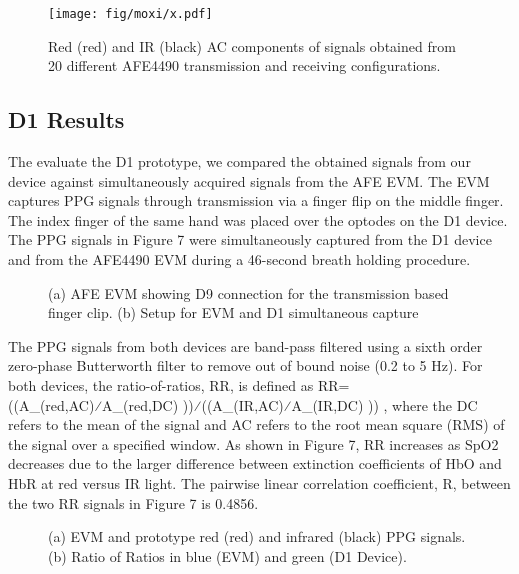         \begin{figure}
            \begin{center}
            \texttt{[image: fig/moxi/x.pdf]}
            \end{center}
            \caption{Red (red) and IR (black) AC components of signals obtained from 20 different AFE4490 transmission and receiving configurations.} 
            \label{fig:xxx}
        \end{figure} 
        
    \subsection{D1 Results}
    The evaluate the D1 prototype, we compared the obtained signals from our device against simultaneously acquired signals from the AFE EVM. The EVM captures PPG signals through transmission via a finger flip on the middle finger. The index finger of the same hand was placed over the optodes on the D1 device. The PPG signals in Figure 7 were simultaneously captured from the D1 device and from the AFE4490 EVM during a 46-second breath holding procedure. 

    \begin{figure}
        \begin{center}
        \end{center}
        \caption{(a) AFE EVM showing D9 connection for the transmission based finger clip. (b) Setup for EVM and D1 simultaneous capture} 
        \label{fig:xx}
    \end{figure} 

    The PPG signals from both devices are band-pass filtered using a sixth order zero-phase Butterworth filter to remove out of bound noise (0.2 to 5 Hz). For both devices, the ratio-of-ratios, RR, is defined as RR=  ((A_(red,AC)⁄A_(red,DC) ))⁄((A_(IR,AC)⁄A_(IR,DC) ))  , where the DC refers to the mean of the signal and AC refers to the root mean square (RMS) of the signal over a specified window. As shown in Figure 7, RR increases as SpO2 decreases due to the larger difference between extinction coefficients of HbO and HbR at red versus IR light. The pairwise linear correlation coefficient, R, between the two RR signals in Figure 7 is 0.4856. 

    \begin{figure}
        \begin{center}
        \end{center}
        \caption{(a) EVM and prototype red (red) and infrared (black) PPG signals. (b) Ratio of Ratios in blue (EVM) and green (D1 Device).} 
        \label{fig:xx}
    \end{figure}



